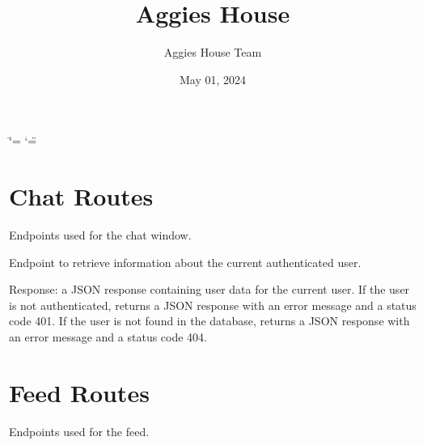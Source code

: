 \documentclass[letterpaper,10pt,english]{sphinxmanual}
\title{Aggie\textquotesingle{}s House}
\date{May 01, 2024}
\author{Aggie\textquotesingle{}s House Team}
\begin{document}
\ifdefined\shorthandoff
  \ifnum\catcode`\=\string=\active\shorthandoff{=}\fi
  \ifnum\catcode`\"=\active{}\fi
\fi

\pagestyle{empty}
\sphinxmaketitle
\pagestyle{plain}
\sphinxtableofcontents
\pagestyle{normal}
\label{\detokenize{index::doc}}


\sphinxstepscope


\chapter{Chat Routes}
\label{\detokenize{routes.chat:module-routes.chat.routes}}\label{\detokenize{routes.chat:chat-routes}}\label{\detokenize{routes.chat::doc}}
\sphinxAtStartPar
Endpoints used for the chat window.

\begin{fulllineitems}
\label{\detokenize{routes.chat:routes.chat.routes.get_user}}
\pysigstartsignatures
{}
\pysigstopsignatures
\sphinxAtStartPar
Endpoint to retrieve information about the current authenticated user.
\begin{description}
\sphinxAtStartPar
Response: a JSON response containing user data for the current user.
\sphinxhyphen{} If the user is not authenticated, returns a JSON response with an error message and a status code 401.
\sphinxhyphen{} If the user is not found in the database, returns a JSON response with an error message and a status code 404.

\end{description}

\end{fulllineitems}


\sphinxstepscope


\chapter{Feed Routes}
\label{\detokenize{routes.feed:module-routes.feed.routes}}\label{\detokenize{routes.feed:feed-routes}}\label{\detokenize{routes.feed::doc}}
\sphinxAtStartPar
Endpoints used for the feed.
\end{document}
